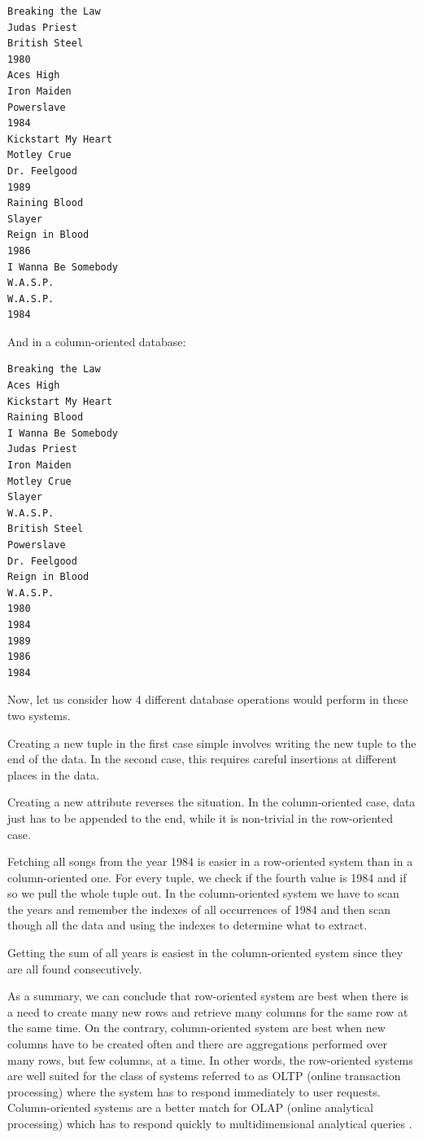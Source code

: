 \begin{verbatim}
Breaking the Law
Judas Priest
British Steel
1980
Aces High
Iron Maiden
Powerslave
1984
Kickstart My Heart
Motley Crue
Dr. Feelgood
1989
Raining Blood
Slayer
Reign in Blood
1986
I Wanna Be Somebody
W.A.S.P.
W.A.S.P.
1984
\end{verbatim}

And in a column-oriented database:

\begin{verbatim}
Breaking the Law
Aces High
Kickstart My Heart
Raining Blood
I Wanna Be Somebody
Judas Priest
Iron Maiden
Motley Crue
Slayer
W.A.S.P.
British Steel
Powerslave
Dr. Feelgood
Reign in Blood
W.A.S.P.
1980
1984
1989
1986
1984
\end{verbatim}

Now, let us consider how 4 different database operations would perform in these two systems.

Creating a new tuple in the first case simple involves writing the new tuple to the end of the data. In the second case, this requires careful insertions at different places in the data.

Creating a new attribute reverses the situation. In the column-oriented case, data just has to be appended to the end, while it is non-trivial in the row-oriented case.

Fetching all songs from the year 1984 is easier in a row-oriented system than in a column-oriented one. For every tuple, we check if the fourth value is 1984 and if so we pull the whole tuple out. In the column-oriented system we have to scan the years and remember the indexes of all occurrences of 1984 and then scan though all the data and using the indexes to determine what to extract.

Getting the sum of all years is easiest in the column-oriented system since they are all found consecutively.

As a summary, we can conclude that row-oriented system are best when there is a need to create many new rows and retrieve many columns for the same row at the same time. On the contrary, column-oriented system are best when new columns have to be created often and there are aggregations performed over many rows, but few columns, at a time. In other words, the row-oriented systems are well suited for the class of systems referred to as OLTP (online transaction processing) where the system has to respond immediately to user requests. Column-oriented systems are a better match for OLAP (online analytical processing) which has to respond quickly to multidimensional analytical queries \cite{CoddCodd}.

